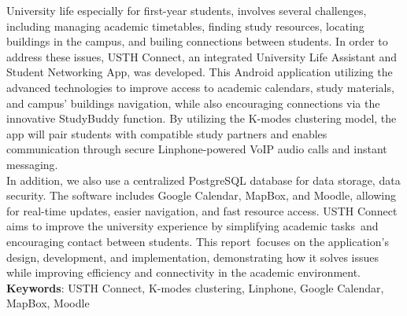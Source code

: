 \noindent University life
especially for first-year students, involves several 
challenges, including managing academic timetables, 
finding study resources, locating buildings in the campus, 
and builing connections between students. In order to address these 
issues, USTH Connect, an integrated University 
Life Assistant and Student Networking App, 
was developed. This Android application utilizing the advanced technologies to improve access to academic calendars, 
study materials, and campus' buildings navigation, 
while also encouraging connections 
via the innovative StudyBuddy function. 
By utilizing the K-modes clustering model, the app will pair students with compatible study partners and enables communication through secure 
Linphone-powered VoIP audio calls and instant messaging.\\

\noindent In addition, we also use a centralized PostgreSQL database for data storage, data security. The software 
includes Google Calendar, MapBox, and Moodle, 
allowing for real-time updates, 
easier navigation, and fast resource access. 
USTH Connect aims to improve the university 
experience by simplifying academic tasks and 
encouraging contact between students. This report focuses 
on the application's design, development, and implementation, 
demonstrating how it solves issues while improving 
efficiency and connectivity in the academic 
environment.\\

\noindent \textbf{Keywords}: USTH Connect,
K-modes clustering, Linphone, Google Calendar, MapBox, Moodle

